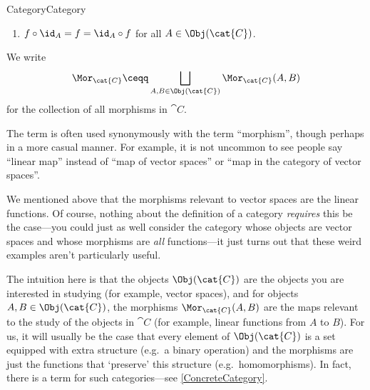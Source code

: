 \begin{dfn}{Category}{Category}
\begin{enumerate}
\item $f\circ \id _A=f=\id _A\circ f$ for all $A\in \Obj (\cat{C})$.
\end{enumerate}
\begin{rmk}
We write
\begin{equation}
\Mor _{\cat{C}}\ceqq \bigsqcup _{A,B\in \Obj (\cat{C})}\Mor _{\cat{C}}(A,B)
\end{equation}
for the collection of all morphisms in $\cat{C}$.
\end{rmk}
\begin{rmk}
The term  is often used synonymously with the term ``morphism'', though perhaps in a more casual manner.  For example, it is not uncommon to see people say ``linear map'' instead of ``map of vector spaces'' or ``map in the category of vector spaces''.
\end{rmk}
\begin{rmk}
We mentioned above that the morphisms relevant to vector spaces are the linear functions.  Of course, nothing about the definition of a category \emph{requires} this be the case---you could just as well consider the category whose objects are vector spaces and whose morphisms are \emph{all} functions---it just turns out that these weird examples aren't particularly useful.
\end{rmk}
\end{dfn}
The intuition here is that the objects $\Obj (\cat{C})$ are the objects you are interested in studying (for example, vector spaces), and for objects $A,B\in \Obj (\cat{C})$, the morphisms $\Mor _{\cat{C}}(A,B)$ are the maps relevant to the study of the objects in $\cat{C}$ (for example, linear functions from $A$ to $B$).  For us, it will usually be the case that every element of $\Obj (\cat{C})$ is a set equipped with extra structure (e.g.~a binary operation) and the morphisms are just the functions that `preserve' this structure (e.g.~homomorphisms).  In fact, there is a term for such categories---see \cref{ConcreteCategory}.

